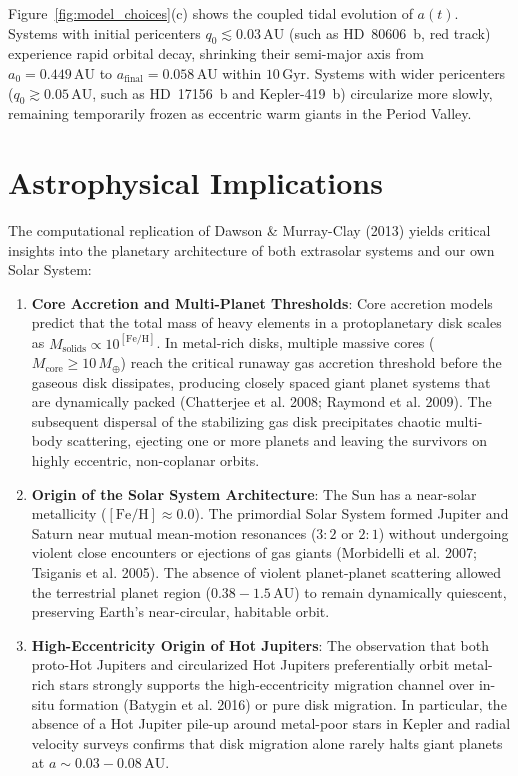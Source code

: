 \documentclass[11pt,a4paper]{article}
\begin{document}
Figure~\ref{fig:model_choices}(c) shows the coupled tidal evolution of $a(t)$. Systems with initial pericenters $q_0 \lesssim 0.03\,\text{AU}$ (such as HD~80606~b, red track) experience rapid orbital decay, shrinking their semi-major axis from $a_0 = 0.449\,\text{AU}$ to $a_{\text{final}} = 0.058\,\text{AU}$ within $10\,\text{Gyr}$. Systems with wider pericenters ($q_0 \gtrsim 0.05\,\text{AU}$, such as HD~17156~b and Kepler-419~b) circularize more slowly, remaining temporarily frozen as eccentric warm giants in the Period Valley.

\section{Astrophysical Implications}
The computational replication of Dawson \& Murray-Clay (2013) yields critical insights into the planetary architecture of both extrasolar systems and our own Solar System:
\begin{enumerate}
    \item \textbf{Core Accretion and Multi-Planet Thresholds}: Core accretion models predict that the total mass of heavy elements in a protoplanetary disk scales as $M_{\text{solids}} \propto 10^{[\text{Fe/H}]}$. In metal-rich disks, multiple massive cores ($M_{\text{core}} \ge 10\,M_\oplus$) reach the critical runaway gas accretion threshold before the gaseous disk dissipates, producing closely spaced giant planet systems that are dynamically packed (Chatterjee et al. 2008; Raymond et al. 2009). The subsequent dispersal of the stabilizing gas disk precipitates chaotic multi-body scattering, ejecting one or more planets and leaving the survivors on highly eccentric, non-coplanar orbits.
    \item \textbf{Origin of the Solar System Architecture}: The Sun has a near-solar metallicity ($[\text{Fe/H}] \approx 0.0$). The primordial Solar System formed Jupiter and Saturn near mutual mean-motion resonances ($3:2$ or $2:1$) without undergoing violent close encounters or ejections of gas giants (Morbidelli et al. 2007; Tsiganis et al. 2005). The absence of violent planet-planet scattering allowed the terrestrial planet region ($0.38 - 1.5\,\text{AU}$) to remain dynamically quiescent, preserving Earth's near-circular, habitable orbit.
    \item \textbf{High-Eccentricity Origin of Hot Jupiters}: The observation that both proto-Hot Jupiters and circularized Hot Jupiters preferentially orbit metal-rich stars strongly supports the high-eccentricity migration channel over in-situ formation (Batygin et al. 2016) or pure disk migration. In particular, the absence of a Hot Jupiter pile-up around metal-poor stars in Kepler and radial velocity surveys confirms that disk migration alone rarely halts giant planets at $a \sim 0.03 - 0.08\,\text{AU}$.
\end{enumerate}
\end{document}
